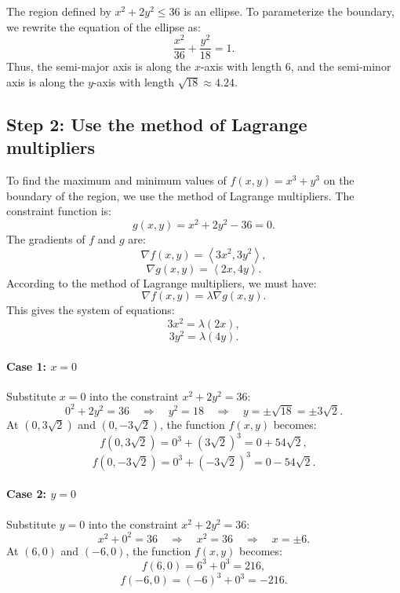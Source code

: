 \documentclass[11pt]{article}
\begin{document}
The region defined by \( x^2 + 2y^2 \leq 36 \) is an ellipse. To parameterize the boundary, we rewrite the equation of the ellipse as:
\[
\frac{x^2}{36} + \frac{y^2}{18} = 1.
\]
Thus, the semi-major axis is along the \( x \)-axis with length 6, and the semi-minor axis is along the \( y \)-axis with length \( \sqrt{18} \approx 4.24 \).

\newpage

\subsection{Step 2: Use the method of Lagrange multipliers}

To find the maximum and minimum values of \( f(x, y) = x^3 + y^3 \) on the boundary of the region, we use the method of Lagrange multipliers. The constraint function is:
\[
g(x, y) = x^2 + 2y^2 - 36 = 0.
\]
The gradients of \( f \) and \( g \) are:
\[
\nabla f(x, y) = \left\langle 3x^2, 3y^2 \right\rangle,
\]
\[
\nabla g(x, y) = \left\langle 2x, 4y \right\rangle.
\]
According to the method of Lagrange multipliers, we must have:
\[
\nabla f(x, y) = \lambda \nabla g(x, y).
\]
This gives the system of equations:
\[
3x^2 = \lambda (2x),
\]
\[
3y^2 = \lambda (4y).
\]

\paragraph{Case 1: \( x = 0 \)}
Substitute \( x = 0 \) into the constraint \( x^2 + 2y^2 = 36 \):
\[
0^2 + 2y^2 = 36 \quad \Rightarrow \quad y^2 = 18 \quad \Rightarrow \quad y = \pm \sqrt{18} = \pm 3\sqrt{2}.
\]
At \( (0, 3\sqrt{2}) \) and \( (0, -3\sqrt{2}) \), the function \( f(x, y) \) becomes:
\[
f(0, 3\sqrt{2}) = 0^3 + (3\sqrt{2})^3 = 0 + 54\sqrt{2},
\]
\[
f(0, -3\sqrt{2}) = 0^3 + (-3\sqrt{2})^3 = 0 - 54\sqrt{2}.
\]

\paragraph{Case 2: \( y = 0 \)}
Substitute \( y = 0 \) into the constraint \( x^2 + 2y^2 = 36 \):
\[
x^2 + 0^2 = 36 \quad \Rightarrow \quad x^2 = 36 \quad \Rightarrow \quad x = \pm 6.
\]
At \( (6, 0) \) and \( (-6, 0) \), the function \( f(x, y) \) becomes:
\[
f(6, 0) = 6^3 + 0^3 = 216,
\]
\[
f(-6, 0) = (-6)^3 + 0^3 = -216.
\]
\end{document}
